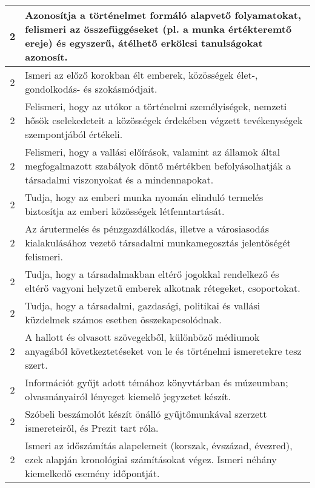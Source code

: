\begin{longtable}{c | p{} }
                                
                                          2 &  Azonosítja a történelmet formáló alapvető folyamatokat, felismeri az összefüggéseket (pl. a munka értékteremtő ereje) és egyszerű, átélhető erkölcsi tanulságokat azonosít. \\ \hline
                                          2 &  Ismeri az előző korokban élt emberek, közösségek élet-, gondolkodás- és szokásmódjait. \\ \hline
                                          2 &  Felismeri, hogy az utókor a történelmi személyiségek, nemzeti hősök cselekedeteit a közösségek érdekében végzett tevékenységek szempontjából értékeli. \\ \hline
                                          2 &  Felismeri, hogy a vallási előírások, valamint az államok által megfogalmazott szabályok döntő mértékben befolyásolhatják a társadalmi viszonyokat és a mindennapokat. \\ \hline
                                          2 &  Tudja, hogy az emberi munka nyomán elinduló termelés biztosítja az emberi közösségek létfenntartását. \\ \hline
                                          2 &  Az árutermelés és pénzgazdálkodás, illetve a városiasodás kialakulásához vezető társadalmi munkamegosztás jelentőségét felismeri. \\ \hline
                                          2 &  Tudja, hogy a társadalmakban eltérő jogokkal rendelkező és eltérő vagyoni helyzetű emberek alkotnak rétegeket, csoportokat. \\ \hline
                                          2 &  Tudja, hogy a társadalmi, gazdasági, politikai és vallási küzdelmek számos esetben összekapcsolódnak. \\ \hline
                                          2 &  A hallott és olvasott szövegekből, különböző médiumok anyagából következtetéseket von le és történelmi ismeretekre tesz szert. \\ \hline
                                          2 &  Információt gyűjt adott témához könyvtárban és múzeumban; olvasmányairól lényeget kiemelő jegyzetet készít. \\ \hline
                                          2 &  Szóbeli beszámolót készít önálló gyűjtőmunkával szerzett ismereteiről, és Prezit tart róla. \\ \hline
                                          2 &  Ismeri az időszámítás alapelemeit (korszak, évszázad, évezred), ezek alapján kronológiai számításokat végez. Ismeri néhány kiemelkedő esemény időpontját. \\ \hline
                                      

\end{longtable}
